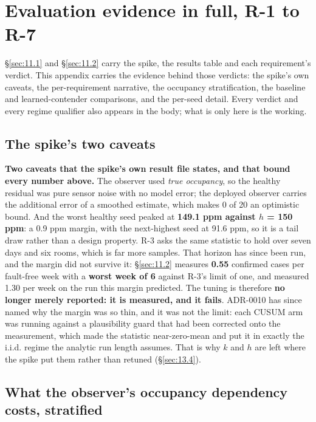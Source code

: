 \section{Evaluation evidence in full, R-1 to R-7}\label{sec:F}

\S\ref{sec:11.1} and \S\ref{sec:11.2} carry the spike, the results table and each requirement's verdict. This appendix
carries the evidence behind those verdicts: the spike's own caveats, the per-requirement narrative,
the occupancy stratification, the baseline and learned-contender comparisons, and the per-seed
detail. Every verdict and every regime qualifier also appears in the body; what is only here is the
working.

\subsection{The spike's two caveats}\label{sec:F.1}

\textbf{Two caveats that the spike's own result file states, and that bound every number above.}
The observer used \emph{true occupancy}, so the healthy residual was pure sensor noise with no
model error; the deployed observer carries the additional error of a smoothed estimate, which makes
0 of 20 an optimistic bound. And the worst healthy seed peaked at \textbf{149.1 ppm against
$h$ = 150 ppm}: a 0.9 ppm margin, with the next-highest seed at 91.6 ppm, so it is a tail draw
rather than a design property. R-3 asks the same statistic to hold over seven days and six rooms,
which is far more samples. That horizon has since been run, and the margin did not survive it:
§\ref{sec:11.2} measures \textbf{0.55} confirmed cases per fault-free week with a \textbf{worst week of 6}
against R-3's limit of one, and measured 1.30 per week on the run this margin predicted. The tuning
is therefore \textbf{no longer merely reported: it is measured, and it fails}. ADR-0010 has since
named why the margin was so thin, and it was not the limit: each CUSUM arm was running against a
plausibility guard that had been corrected onto the measurement, which made the statistic
near-zero-mean and put it in exactly the i.i.d. regime the analytic run length assumes. That is why
$k$ and $h$ are left where the spike put them rather than retuned (§\ref{sec:13.4}).


\subsection{What the observer's occupancy dependency costs, stratified}\label{sec:F.2}

